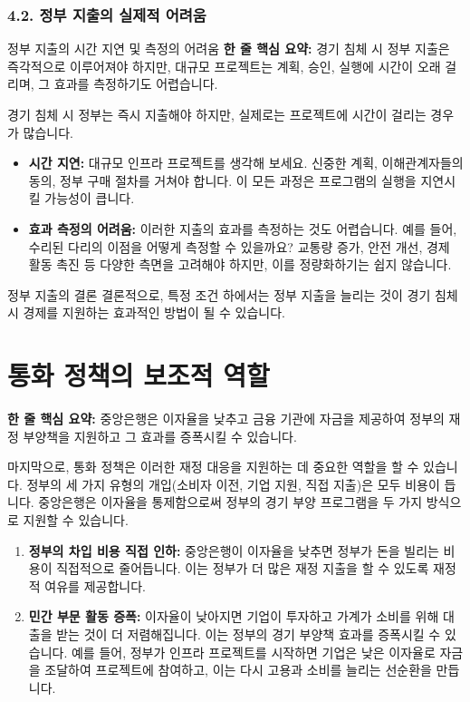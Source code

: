 \documentclass[11pt,a4paper]{article}
\begin{document}
\subsubsection*{4.2. 정부 지출의 실제적 어려움}

\begin{cautionbox}{정부 지출의 시간 지연 및 측정의 어려움}
    \textbf{한 줄 핵심 요약:} 경기 침체 시 정부 지출은 즉각적으로 이루어져야 하지만, 대규모 프로젝트는 계획, 승인, 실행에 시간이 오래 걸리며, 그 효과를 측정하기도 어렵습니다.
\end{cautionbox}

경기 침체 시 정부는 즉시 지출해야 하지만, 실제로는 프로젝트에 시간이 걸리는 경우가 많습니다.
\begin{itemize}
    \item \textbf{시간 지연:} 대규모 인프라 프로젝트를 생각해 보세요. 신중한 계획, 이해관계자들의 동의, 정부 구매 절차를 거쳐야 합니다. 이 모든 과정은 프로그램의 실행을 지연시킬 가능성이 큽니다.
    \item \textbf{효과 측정의 어려움:} 이러한 지출의 효과를 측정하는 것도 어렵습니다. 예를 들어, 수리된 다리의 이점을 어떻게 측정할 수 있을까요? 교통량 증가, 안전 개선, 경제 활동 촉진 등 다양한 측면을 고려해야 하지만, 이를 정량화하기는 쉽지 않습니다.
\end{itemize}

\begin{summarybox}{정부 지출의 결론}
    결론적으로, 특정 조건 하에서는 정부 지출을 늘리는 것이 경기 침체 시 경제를 지원하는 효과적인 방법이 될 수 있습니다.
\end{summarybox}

\newpage
\section*{통화 정책의 보조적 역할}

\begin{tcolorbox}[mybox={재정 정책을 지원하는 통화 정책}]
    \textbf{한 줄 핵심 요약:} 중앙은행은 이자율을 낮추고 금융 기관에 자금을 제공하여 정부의 재정 부양책을 지원하고 그 효과를 증폭시킬 수 있습니다.
\end{tcolorbox}

마지막으로, 통화 정책은 이러한 재정 대응을 지원하는 데 중요한 역할을 할 수 있습니다. 정부의 세 가지 유형의 개입(소비자 이전, 기업 지원, 직접 지출)은 모두 비용이 듭니다. 중앙은행은 이자율을 통제함으로써 정부의 경기 부양 프로그램을 두 가지 방식으로 지원할 수 있습니다.

\begin{enumerate}
    \item \textbf{정부의 차입 비용 직접 인하:} 중앙은행이 이자율을 낮추면 정부가 돈을 빌리는 비용이 직접적으로 줄어듭니다. 이는 정부가 더 많은 재정 지출을 할 수 있도록 재정적 여유를 제공합니다.
    \item \textbf{민간 부문 활동 증폭:} 이자율이 낮아지면 기업이 투자하고 가계가 소비를 위해 대출을 받는 것이 더 저렴해집니다. 이는 정부의 경기 부양책 효과를 증폭시킬 수 있습니다. 예를 들어, 정부가 인프라 프로젝트를 시작하면 기업은 낮은 이자율로 자금을 조달하여 프로젝트에 참여하고, 이는 다시 고용과 소비를 늘리는 선순환을 만듭니다.
\end{enumerate}
\end{document}
